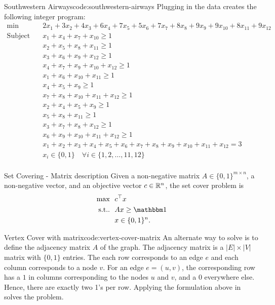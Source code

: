 \documentclass[../open-optimization/open-optimization.tex]{subfiles}
\begin{document}
\begin{examplewithcode}{Southwestern Airways\footnotemark}{code:southwestern-airways}
Plugging in the data creates the following integer program:
\begin{align*}\min\quad & 2 x_{1} + 3 x_{2} + 4 x_{3} + 6 x_{4} + 7 x_{5} + 5 x_{6} + 7 x_{7} + 8 x_{8} + 9 x_{9} + 9 x_{10} + 8 x_{11} + 9 x_{12}\\
\text{Subject to} \quad & x_{1} + x_{4} + x_{7} + x_{10} \geq 1\\
 & x_{2} + x_{5} + x_{8} + x_{11} \geq 1\\
 & x_{3} + x_{6} + x_{9} + x_{12} \geq 1\\
 & x_{4} + x_{7} + x_{9} + x_{10} + x_{12} \geq 1\\
 & x_{1} + x_{6} + x_{10} + x_{11} \geq 1\\
 & x_{4} + x_{5} + x_{9} \geq 1\\
 & x_{7} + x_{8} + x_{10} + x_{11} + x_{12} \geq 1\\
 & x_{2} + x_{4} + x_{5} + x_{9} \geq 1\\
 & x_{5} + x_{8} + x_{11} \geq 1\\
 & x_{3} + x_{7} + x_{8} + x_{12} \geq 1\\
 & x_{6} + x_{9} + x_{10} + x_{11} + x_{12} \geq 1\\
 & x_{1} + x_{2} + x_{3} + x_{4} + x_{5} + x_{6} + x_{7} + x_{8} + x_{9} + x_{10} + x_{11} + x_{12} = 3\\
 & x_{i} \in \{0,1\} \quad\forall i \in \{1,2,\dots,11,12\}\\
\end{align*}

\end{examplewithcode}

\begin{general}{Set Covering - Matrix description}{\npcomplete}
\label{general:set-covering-alternate}
Given a non-negative matrix $A \in \{0,1\}^{m \times n}$, a non-negative vector, and an objective vector $c \in {\mathbb{R}}^n$, the set cover problem is
\begin{equation}
\begin{split}
\max \ \ & c^\top x\\
\text{s.t.}. \ \ & Ax \geq \one \\
& x \in \{0,1\}^n.
\end{split}
\end{equation}
\end{general}
\begin{examplewithcode}{Vertex Cover with matrix}{code:vertex-cover-matrix}
An alternate way to solve  is to define the adjacency matrix $A$ of the graph.  The adjacency matrix is a $|E| \times |V|$ matrix with $\{0,1\}$ entries.  The each row corresponds to an edge $e$ and each column corresponds to a node $v$.  For an edge $e = (u,v)$, the corresponding row has a $1$ in columns corresponding to the nodes $u$ and $v$, and a 0 everywhere else.  Hence, there are exactly two 1's per row.  Applying the formulation above in  solves the problem.
\end{examplewithcode}
\end{document}
